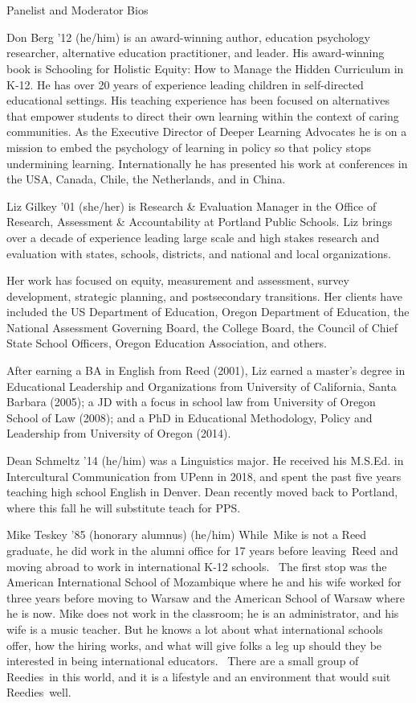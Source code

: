 \documentclass[
]{article}
\begin{document}
~

~

Panelist and Moderator Bios

Don Berg '12 (he/him) is an award-winning author, education psychology
researcher, alternative education practitioner, and leader. His
award-winning book is Schooling for Holistic Equity: How to Manage the
Hidden Curriculum in K-12. He has over 20 years of experience leading
children in self-directed educational settings. His teaching experience
has been focused on alternatives that empower students to direct their
own learning within the context of caring communities. As the Executive
Director of Deeper Learning Advocates he is on a mission to embed the
psychology of learning in policy so that policy stops undermining
learning. Internationally he has presented his work at conferences in
the USA, Canada, Chile, the Netherlands, and in China.

Liz Gilkey '01 (she/her) is Research \& Evaluation Manager in the Office
of Research, Assessment \& Accountability at Portland Public Schools.
Liz brings over a decade of experience leading large scale and high
stakes research and evaluation with states, schools, districts, and
national and local organizations.~

Her work has focused on equity, measurement and assessment, survey
development, strategic planning, and postsecondary transitions. Her
clients have included the US Department of Education, Oregon Department
of Education, the National Assessment Governing Board, the College
Board, the Council of Chief State School Officers, Oregon Education
Association, and others.

After earning a BA in English from Reed (2001), Liz earned a master's
degree in Educational Leadership and Organizations from University of
California, Santa Barbara (2005); a JD with a focus in school law from
University of Oregon School of Law (2008); and a PhD in Educational
Methodology, Policy and Leadership from University of Oregon (2014).

Dean Schmeltz '14 (he/him) was a Linguistics major. He received his
M.S.Ed. in Intercultural Communication from UPenn in 2018, and spent the
past five years teaching high school English in Denver. Dean recently
moved back to Portland, where this fall he will substitute teach for
PPS.

Mike Teskey '85 (honorary alumnus) (he/him) While~Mike is not a Reed
graduate, he did work in the alumni office for 17 years before
leaving~Reed and moving abroad to work in international K-12 schools.~
The first stop was the American International School of Mozambique where
he and his wife worked for three years before moving to Warsaw and the
American School of Warsaw where he is now. Mike does not work in the
classroom; he is an administrator, and his wife is a music teacher. But
he knows a lot about what international schools offer, how the hiring
works, and what will give folks a leg up should they be interested in
being international educators.~ There are a small group of Reedies~in
this world, and it is a lifestyle and an environment that would suit
Reedies~well.~
\end{document}
